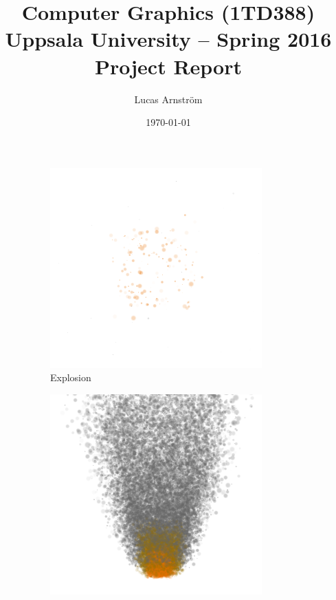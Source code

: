 \documentclass[a4paper]{article}
\title{Computer Graphics (1TD388) \\ Uppsala University -- Spring 2016 \\ Project Report}
\author{Lucas Arnström}
\date{\today}
\begin{document}
\maketitle

\begin{figure}[htbp]
    \centering
    \begin{subfigure}[ht]{0.22\textwidth}
        \includegraphics[width=\textwidth]{figures/explosion.png}
        \caption{Explosion}
        \label{fig:simulations_explosion}
    \end{subfigure}
    \begin{subfigure}[ht]{0.22\textwidth}
        \includegraphics[width=\textwidth]{figures/fire.png}

\end{subfigure}
\end{figure}
\end{document}
